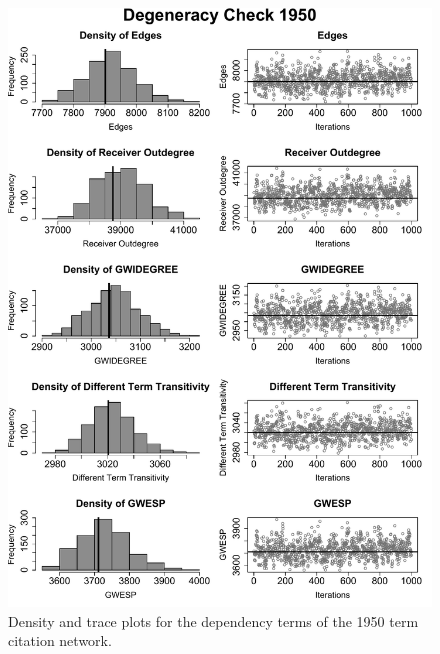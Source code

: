 \documentclass[headsepline=true, abstracton]{scrartcl}
\begin{document}
\begin{figure}[bt]
	\begin{center}
		\includegraphics[width=1\textwidth]{Deg_1950}
		\caption{Density and trace plots for the dependency terms of the 1950 term citation network.}
		\label{mcmcdiagnostics_1950}
		\vspace{-.25cm}
	\end{center}
\end{figure} 
\end{document}
